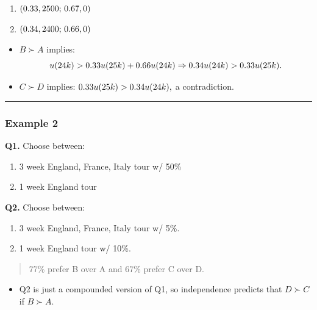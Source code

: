 \documentclass[
  letterpaper,
  DIV=11,
  numbers=noendperiod]{scrartcl}
\providecommand{\tightlist}{%
  \setlength{\itemsep}{0pt}\setlength{\parskip}{0pt}}\usepackage{longtable,booktabs,array}
\begin{document}
\begin{enumerate}
\def\labelenumi{(\Alph{enumi})}
\setcounter{enumi}{2}
\tightlist
\item
  \(\tiny(0.33,2500;\,0.67,0)\)
\item
  \(\tiny(0.34,2400;\,0.66,0)\)
\end{enumerate}

\begin{itemize}
\item
  \(B\succ A\) implies: \[
  \small
  u(24k) > 0.33 u(25k) + 0.66 u(24k) \Rightarrow 0.34u(24k) > 0.33u(25k). 
  \]
\item
  \(C\succ D\) implies: \(\small 0.33 u(25k) > 0.34 u(24k),\) a
  contradiction.
\end{itemize}

\begin{center}\rule{0.5\linewidth}{0.5pt}\end{center}

\subsubsection{Example 2}\label{example-2}

\textbf{Q1.} Choose between:

\begin{enumerate}
\def\labelenumi{(\Alph{enumi})}
\tightlist
\item
  3 week England, France, Italy tour w/ 50\%
\item
  1 week England tour
\end{enumerate}

\textbf{Q2.} Choose between: ~

\begin{enumerate}
\def\labelenumi{(\Alph{enumi})}
\setcounter{enumi}{2}
\tightlist
\item
  3 week England, France, Italy tour w/ 5\%.
\item
  1 week England tour w/ 10\%.
\end{enumerate}

\begin{quote}
77\% prefer B over A and 67\% prefer C over D.
\end{quote}

\begin{itemize}
\tightlist
\item
  Q2 is just a compounded version of Q1, so independence predicts that
  \(D\succ C\) if \(B\succ A\).
\end{itemize}
\end{document}
